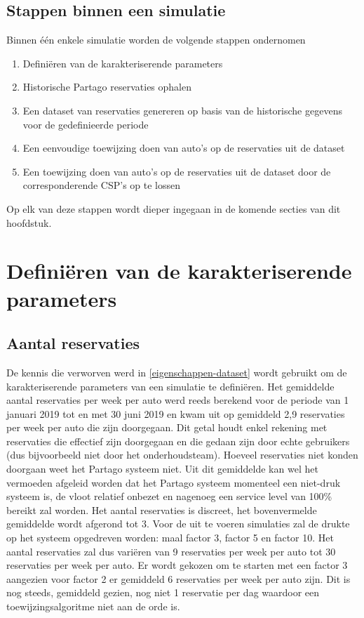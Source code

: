 \subsection{Stappen binnen een simulatie}
Binnen één enkele simulatie worden de volgende stappen ondernomen
\begin{enumerate}
	\item Definiëren van de karakteriserende parameters
	\item Historische Partago reservaties ophalen
	\item Een dataset van reservaties genereren op basis van de historische gegevens voor de gedefinieerde periode
	\item Een eenvoudige toewijzing doen van auto's op de reservaties uit de dataset
	\item Een toewijzing doen van auto's op de reservaties uit de dataset door de corresponderende CSP's op te lossen
	
\end{enumerate}
Op elk van deze stappen wordt dieper ingegaan in de komende secties van dit hoofdstuk. 

\section{Definiëren van de karakteriserende parameters} \label{karakteriserende-parameters}
\subsection{Aantal reservaties}
De kennis die verworven werd in \ref{eigenschappen-dataset} wordt gebruikt om de karakteriserende parameters van een simulatie te definiëren. Het gemiddelde aantal reservaties per week per auto werd reeds berekend voor de periode van 1 januari 2019 tot en met 30 juni 2019 en kwam uit op gemiddeld 2,9 reservaties per week per auto die zijn doorgegaan. Dit getal houdt enkel rekening met reservaties die effectief zijn doorgegaan en die gedaan zijn door echte gebruikers (dus bijvoorbeeld niet door het onderhoudsteam). Hoeveel reservaties niet konden doorgaan weet het Partago systeem niet. Uit dit gemiddelde kan wel het vermoeden afgeleid worden dat het Partago systeem momenteel een niet-druk systeem is, de vloot relatief onbezet en nagenoeg een service level van 100\% bereikt zal worden. Het aantal reservaties is discreet, het bovenvermelde gemiddelde wordt afgerond tot 3. Voor de uit te voeren simulaties zal de drukte op het systeem opgedreven worden: maal factor 3, factor 5 en factor 10. Het aantal reservaties zal dus variëren van 9 reservaties per week per auto tot 30 reservaties per week per auto. Er wordt gekozen om te starten met een factor 3 aangezien voor factor 2 er gemiddeld 6 reservaties per week per auto zijn. Dit is nog steeds, gemiddeld gezien, nog niet 1 reservatie per dag waardoor een toewijzingsalgoritme niet aan de orde is.
